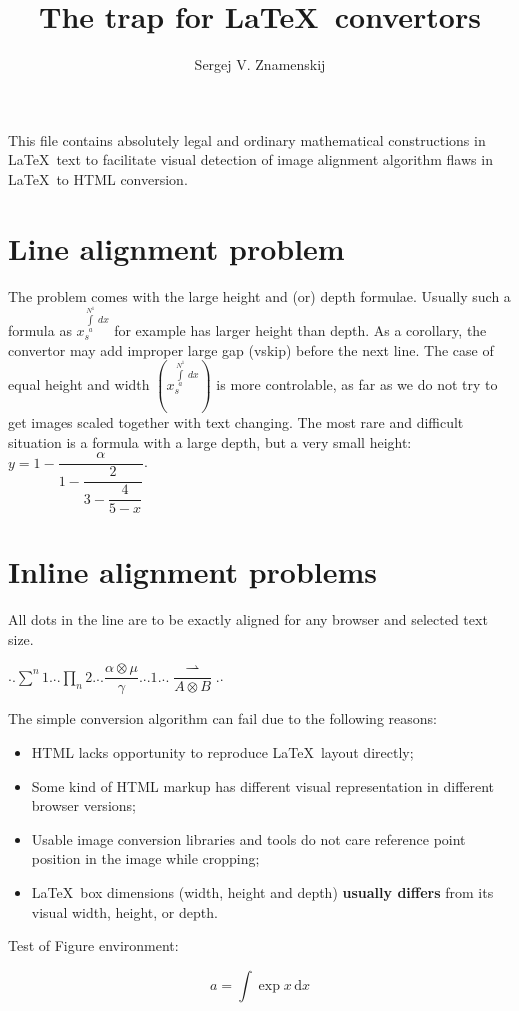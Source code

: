 \documentclass[12pt]{amsart}
\title{The trap for \LaTeX\ convertors}
\author{Sergej V. Znamenskij}
\begin{document}
\maketitle

This file contains absolutely legal and ordinary
mathematical constructions in \LaTeX\ text to facilitate visual
detection of image alignment algorithm flaws in \LaTeX\ to HTML conversion.

\section {Line alignment problem}
The problem comes with the large height and (or) depth formulae. 
Usually such a formula as $x_s^{\int\limits_a^{N^1}\, dx}$ for example has
larger height than depth. As a corollary, the convertor may add improper large gap (vskip) before the next
line. The case of equal height and width $\left(x_s^{\int\limits_a^{N^1}\, dx}\right)$ is more controlable, 
as far as we do not try to get images scaled together with text changing.
The most rare and difficult situation is a formula with a large depth, but a very small height: 
$y=1-\dfrac{\alpha}{1-\dfrac{2}{3-\dfrac{4}{5-x}}}$.

\section {Inline alignment problems}All dots in the line are to be exactly aligned for any browser and selected text size.

.$.\sum\limits^n1.$.$.\prod\limits_n2.$.$.\dfrac{\alpha\otimes\mu}{\gamma}.$.$.1.$.$.\dfrac {\rightharpoonup}{A\otimes B}.$.

The simple conversion algorithm can fail due to the following reasons:
\begin {itemize} 
\item HTML lacks opportunity to reproduce \LaTeX\ layout directly;
\item Some kind of HTML markup has different visual representation in different browser versions;  
\item Usable image conversion libraries and tools do not care reference point position in the image while cropping;
\item \LaTeX\ box dimensions (width, height and depth) \textbf{usually differs} from its visual width, height, or depth. 
\end {itemize}

Test of Figure environment:
\begin{figure}
\[ a = \int \exp{x} \,\mathrm{d}x \]
\end{figure}
\end{document}
